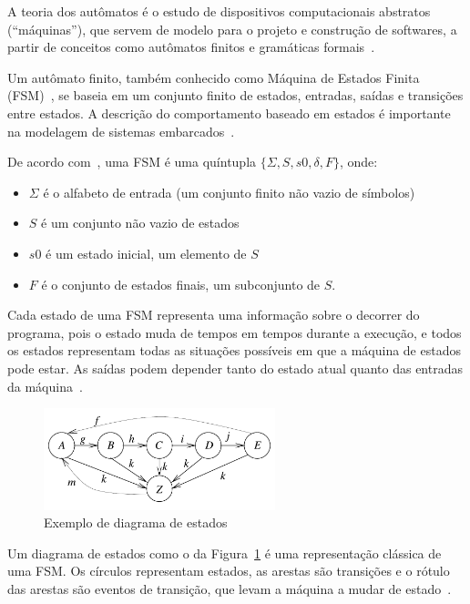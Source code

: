A teoria dos autômatos é o estudo de dispositivos computacionais abstratos (``máquinas''), que servem de modelo para o projeto e construção de softwares, a partir de conceitos como autômatos finitos e gramáticas formais~\cite{hopcroft:2001}.

Um autômato finito, também conhecido como Máquina de Estados Finita (FSM)~\cite{wagner:2006}, se baseia em um conjunto finito de estados, entradas, saídas e transições entre estados. A descrição do comportamento baseado em estados é importante na modelagem de sistemas embarcados~\cite{marwedel:2010}.

De acordo com~, uma FSM é uma quíntupla \(\{\Sigma, S, s0, \delta, F\}\), onde:
\begin{itemize}
    \item \(\Sigma\) é o alfabeto de entrada (um conjunto finito não vazio de símbolos)
    \item \(S\) é um conjunto não vazio de estados
    \item \(s0\) é um estado inicial, um elemento de \(S\)
    \item \(F\) é o conjunto de estados finais, um subconjunto de \(S\).
\end{itemize}

Cada estado de uma FSM representa uma informação sobre o decorrer do programa, pois o estado muda de tempos em tempos durante a execução, e todos os estados representam todas as situações possíveis em que a máquina de estados pode estar. As saídas podem depender tanto do estado atual quanto das entradas da máquina~\cite{wagner:2006}.

\begin{figure}[ht]
	\caption{\label{fig:fsm}Exemplo de diagrama de estados}
	\begin{center}
	    \includegraphics[width=0.6\textwidth]{resources/fsm_marwedel}
	\end{center}
\end{figure}

Um diagrama de estados como o da Figura~\ref{fig:fsm} é uma representação clássica de uma FSM\@. Os círculos representam estados, as arestas são transições e o rótulo das arestas são eventos de transição, que levam a máquina a mudar de estado~\cite{marwedel:2010}.

